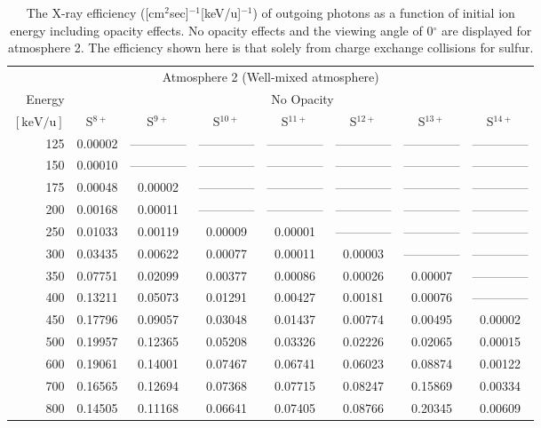\begin{table}[ht]
    \centering
    \caption{The X-ray efficiency ([cm$^2$sec]$^{-1}$[keV/u]$^{-1}$) of outgoing photons as a function of initial ion energy including opacity effects. No opacity effects and the viewing angle of 0$^\circ$ are displayed for atmosphere 2. The efficiency shown here is that solely from charge exchange collisions for sulfur.}
    \begin{tabular}{r|c|c|c|c|c|c|c}
    \multicolumn{8}{c}{Atmosphere 2 (Well-mixed atmosphere)} \\ \cline{2-8}
    Energy & \multicolumn{7}{c}{No Opacity} \\ \cline{2-8}
    $\mathrm{[keV/u]}$ & S$^{8+}$ & S$^{9+}$ & S$^{10+}$ & S$^{11+}$ & S$^{12+}$ & S$^{13+}$ & S$^{14+}$ \\ \cline{1-8}
      125 & 0.00002 & -------------- & -------------- & -------------- & -------------- & -------------- & -------------- \\
      150 & 0.00010 & -------------- & -------------- & -------------- & -------------- & -------------- & -------------- \\
      175 & 0.00048 & 0.00002 & -------------- & -------------- & -------------- & -------------- & -------------- \\
      200 & 0.00168 & 0.00011 & -------------- & -------------- & -------------- & -------------- & -------------- \\
      250 & 0.01033 & 0.00119 & 0.00009 & 0.00001 & -------------- & -------------- & -------------- \\
      300 & 0.03435 & 0.00622 & 0.00077 & 0.00011 & 0.00003 & -------------- & -------------- \\
      350 & 0.07751 & 0.02099 & 0.00377 & 0.00086 & 0.00026 & 0.00007 & -------------- \\
      400 & 0.13211 & 0.05073 & 0.01291 & 0.00427 & 0.00181 & 0.00076 & -------------- \\
      450 & 0.17796 & 0.09057 & 0.03048 & 0.01437 & 0.00774 & 0.00495 & 0.00002 \\
      500 & 0.19957 & 0.12365 & 0.05208 & 0.03326 & 0.02226 & 0.02065 & 0.00015 \\
      600 & 0.19061 & 0.14001 & 0.07467 & 0.06741 & 0.06023 & 0.08874 & 0.00122 \\
      700 & 0.16565 & 0.12694 & 0.07368 & 0.07715 & 0.08247 & 0.15869 & 0.00334 \\
      800 & 0.14505 & 0.11168 & 0.06641 & 0.07405 & 0.08766 & 0.20345 & 0.00609 \\

\end{tabular}
\end{table}
